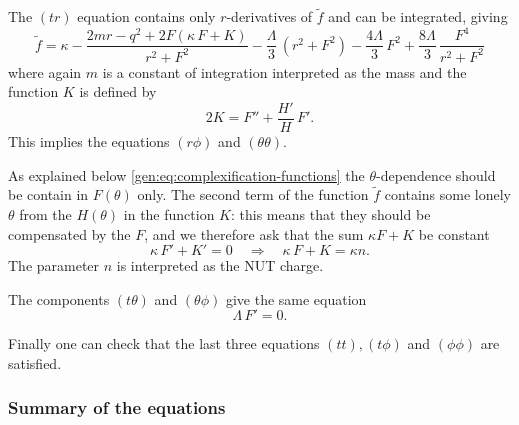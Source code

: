 The $(tr)$ equation contains only $r$-derivatives of $\tilde f$ and can be integrated, giving\footnotemark{}%
\begin{equation}
	\tilde f = \kappa - \frac{2m r - q^2 + 2 F (\kappa\, F + K)}{r^2 + F^2} - \frac{\Lambda}{3}\, (r^2 + F^2) - \frac{4 \Lambda}{3}\, F^2 + \frac{8 \Lambda}{3}\, \frac{F^4}{r^2 + F^2}
\end{equation} 
where again $m$ is a constant of integration interpreted as the mass and the function $K$ is defined by
\begin{equation}
	2 K = F'' + \frac{H'}{H}\, F'.
\end{equation} 
This implies the equations $(r\phi)$ and $(\theta\theta)$.

As explained below \eqref{gen:eq:complexification-functions} the $\theta$-dependence should be contain in $F(\theta)$ only.
The second term of the function $\tilde f$ contains some lonely $\theta$ from the $H(\theta)$ in the function $K$: this means that they should be compensated by the $F$, and we therefore ask that the sum $\kappa F + K$ be constant\footnotemark{}%
\begin{equation}
	\kappa\, F' + K' = 0
	\quad \Longrightarrow \quad
	\kappa\, F + K = \kappa n.
\end{equation} 
The parameter $n$ is interpreted as the NUT charge.

The components $(t\theta)$ and $(\theta\phi)$ give the same equation
\begin{equation}
	\Lambda\, F' = 0.
\end{equation} 

Finally one can check that the last three equations $(tt), (t\phi)$ and $(\phi\phi)$ are satisfied.


\subsubsection{Summary of the equations}


